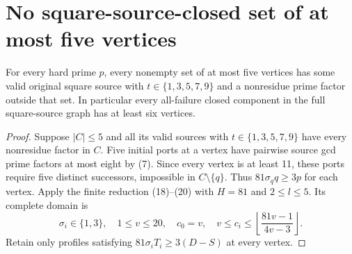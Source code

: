 \section{No square-source-closed set of at most five vertices}
\begin{theorem}\label{thm:five}
For every hard prime $p$, every nonempty set of at most five vertices has some
valid original square source with $t\in\{1,3,5,7,9\}$ and a nonresidue prime factor outside that set.
In particular every all-failure closed component in the full square-source graph
has at least six vertices.
\end{theorem}
\begin{proof}
Suppose $|C|\le5$ and all its valid sources with $t\in\{1,3,5,7,9\}$ have every nonresidue factor in $C$. Five initial ports at a vertex have pairwise
source gcd prime factors at most eight by (7). Since every vertex is at least 11,
these ports require five distinct successors, impossible in $C\setminus\{q\}$.
Thus $81\sigma_q q\ge3p$ for each vertex. Apply the finite reduction (18)--(20)
with $H=81$ and $2\le l\le5$. Its complete domain is
\[
 \sigma_i\in\{1,3\},\quad 1\le v\le20,\quad c_0=v,\quad
 v\le c_i\le\left\lfloor\frac{81v-1}{4v-3}\right\rfloor.        \tag{21}
\]
Retain only profiles satisfying $81\sigma_iT_i\ge3(D-S)$ at every vertex.


\end{proof}
